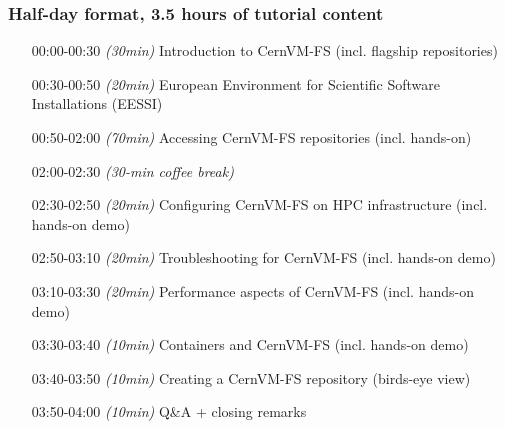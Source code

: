 % 
 

\subsubsection*{Half-day format, 3.5 hours of tutorial content}

\begin{itemize}[style=standard, labelwidth=1.9cm]

    \item [00:00-00:30] \emph{(30min)} Introduction to CernVM-FS (incl. flagship repositories)
    \item [00:30-00:50] \emph{(20min)} European Environment for Scientific Software Installations (EESSI)
    \item [00:50-02:00] \emph{(70min)} Accessing CernVM-FS repositories (incl. hands-on)

    \item [02:00-02:30] \emph{(30-min coffee break)}
    \item [02:30-02:50] \emph{(20min)} Configuring CernVM-FS on HPC infrastructure (incl. hands-on demo)
    \item [02:50-03:10] \emph{(20min)} Troubleshooting for CernVM-FS (incl. hands-on demo)
    \item [03:10-03:30] \emph{(20min)} Performance aspects of CernVM-FS (incl. hands-on demo)
    \item [03:30-03:40] \emph{(10min)} Containers and CernVM-FS (incl. hands-on demo)
    \item [03:40-03:50] \emph{(10min)} Creating a CernVM-FS repository (birds-eye view)
    \item [03:50-04:00] \emph{(10min)} Q\&A + closing remarks

\end{itemize}

